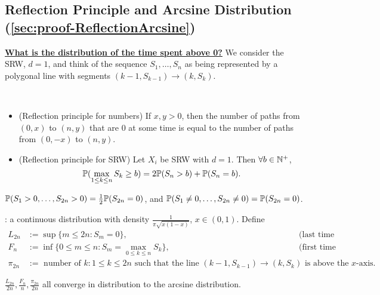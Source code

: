\documentclass[10pt,a4paper]{article}
\begin{document}
\subsection{Reflection Principle and Arcsine Distribution (\ref{sec:proof-ReflectionArcsine})}\label{sec:ReflectionArcsine}
\noindent \underline{\textbf{What is the distribution of the time spent above 0?}} We consider the SRW, $d=1$, and think of the sequence $S_1,\ldots,S_n$ as being represented by a polygonal line with segments $(k-1,S_{k-1})\rightarrow (k,S_k)$.  
\begin{thmbox}
	\begin{theorem}\label{thm:ReflectionPrin}
		\
		\begin{itemize}
			\item (Reflection principle for numbers) If $x,y>0$, then the number of paths from $(0,x)$ to $(n,y)$ that are 0 at some time is equal to the number of paths from $(0,-x)$ to $(n,y)$.    
			\item (Reflection principle for SRW) 
			Let $X_i$ be SRW with $d=1$. Then $\forall b\in\mathbb N^+$, 
			\begin{equation*}
				\mathbb P(\max_{1\leq k\leq n} S_k\geq b)=2\mathbb P(S_n>b) + \mathbb P(S_n=b).
			\end{equation*}  
		\end{itemize}
	\end{theorem}
		
	\begin{theorem}\label{thm:ReflectionHit0} $\mathbb P(S_1> 0,\ldots,S_{2n}> 0)=\frac12\mathbb P(S_{2n}=0)$, and
		$\mathbb P(S_1\neq 0,\ldots,S_{2n}\neq 0)=\mathbb P(S_{2n}=0)$. 
	\end{theorem}
\end{thmbox}

\noindent {}: a continuous distribution with density $\frac1{\pi\sqrt{x(1-x)}}$, $x\in(0,1)$. Define 
\begin{align*}
	L_{2n}&:=\sup\{m\leq2n:S_m=0\}, &\text{(last time at 0)}\\
	F_n&:=\inf\{0\leq m\leq n:S_m=\max\limits_{0\leq k\leq n}S_k\},&\text{(first time at maximum)}\\
	\pi_{2n}&:=\text{ number of } k:1\leq k\leq2n \text{ such that the line } (k-1,S_{k-1})\to(k,S_k) \text{ is above the $x$-axis}.
\end{align*}

\begin{thmbox}
	\begin{theorem}\label{thm:ArcsineLaw}
		$\frac{L_{2n}}{2n},\frac{F_n}n,\frac{\pi_{2n}}{2n}$ all converge in distribution to the arcsine distribution.
	\end{theorem}
\end{thmbox}
\end{document}

